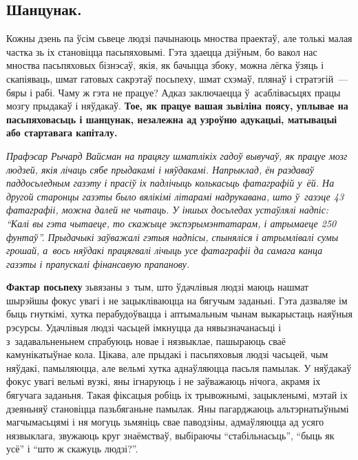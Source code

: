 \subsection*{Шанцунак.}

Кожны дзень па ўсім сьвеце людзі пачынаюць мноства праектаў, але толькі малая частка зь іх становіцца пасьпяховымі. Гэта здаецца дзіўным, бо вакол нас мноства пасьпяховых бізнэсаў, якія, як бачыцца збоку, можна лёгка ўзяць і скапіяваць, шмат гатовых сакрэтаў посьпеху, шмат схэмаў, плянаў і стратэгій~--- бяры і рабі. Чаму ж гэта не працуе? Адказ заключаецца ў~асаблівасьцях працы мозгу прыдакаў і няўдакаў. \textbf{Тое, як працуе вашая зьвіліна поясу, уплывае на пасьпяховасьць і шанцунак, незалежна ад узроўню адукацыі, матывацыі або стартавага капіталу.}

\emph{Прафэсар Рычард Вайсман на працягу шматлікіх гадоў вывучаў, як працуе мозг людзей, якія лічаць сябе прыдакамі і няўдакамі. Напрыклад, ён раздаваў паддосьледным газэту і прасіў іх падлічыць колькасьць фатаграфій у~ёй. На другой старонцы газэты было вялікімі літарамі надрукавана, што ў~газэце 43 фатаграфіі, можна далей не чытаць. У іншых досьледах устаўлялі надпіс: ``Калі вы гэта чытаеце, то скажыце экспэрымэнтатарам, і атрымаеце 250 фунтаў''. Прыдачыкі заўважалі гэтыя надпісы, спыняліся і атрымлівалі сумы грошай, а~вось няўдакі працягвалі лічыць усе фатаграфіі да самага канца газэты і прапускалі фінансавую прапанову.}

\textbf{Фактар посьпеху} зьвязаны з~тым, што ўдачлівыя людзі маюць нашмат шырэйшы фокус увагі і не зацыкліваюцца на бягучым заданьні. Гэта дазваляе ім быць гнуткімі, хутка перабудоўвацца і аптымальным чынам выкарыстаць наяўныя рэсурсы. Удачлівыя людзі часьцей імкнуцца да нявызначанасьці і з~задавальненьнем спрабуюць новае і нязвыклае, пашыраюць сваё камунікатыўнае кола. Цікава, але прыдакі і пасьпяховыя людзі часьцей, чым няўдакі, памыляюцца, але вельмі хутка аднаўляюцца пасьля памылак. У няўдакаў фокус увагі вельмі вузкі, яны ігнаруюць і не заўважаюць нічога, акрамя іх бягучага заданьня. Такая фіксацыя робіць іх трывожнымі, зацыкленымі, мэтай іх дзеяньняў становіцца пазьбяганьне памылак. Яны пагарджаюць альтэрнатыўнымі магчымасьцямі і ня могуць зьмяніць свае паводзіны, адмаўляюцца ад усяго нязвыклага, звужаюць круг знаёмстваў, выбіраючы ``стабільнасьць'', ``быць як усё'' і ``што ж скажуць людзі?''. 


